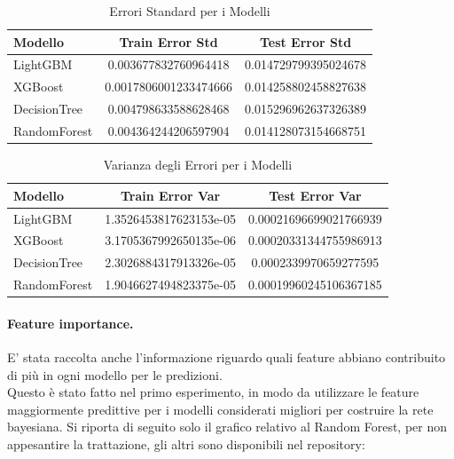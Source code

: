 \begin{table}[H]
    \centering
    \begin{tabular}{lcc}
    \toprule
    \textbf{Modello} & \textbf{Train Error Std} & \textbf{Test Error Std} \\
    \midrule
    LightGBM & 0.003677832760964418 & 0.014729799395024678 \\
    XGBoost & 0.0017806001233474666 & 0.014258802458827638 \\
    DecisionTree & 0.004798633588628468 & 0.015296962637326389 \\
    RandomForest & 0.004364244206597904 & 0.014128073154668751 \\
    \bottomrule
    \end{tabular}
    \caption{Errori Standard per i Modelli}
    
\end{table}

\begin{table}[H]
    \centering
    \begin{tabular}{lcc}
    \toprule
    \textbf{Modello} & \textbf{Train Error Var} & \textbf{Test Error Var} \\
    \midrule
    LightGBM & 1.3526453817623153e-05 & 0.00021696699021766939 \\
    XGBoost & 3.1705367992650135e-06 & 0.00020331344755986913 \\
    DecisionTree & 2.3026884317913326e-05 & 0.0002339970659277595 \\
    RandomForest & 1.9046627494823375e-05 & 0.00019960245106367185 \\
    \bottomrule
    \end{tabular}
    \caption{Varianza degli Errori per i Modelli}
    
\end{table}

\paragraph{Feature importance.} E' stata raccolta anche l'informazione riguardo quali feature abbiano contribuito di più in ogni modello per le predizioni.
\\Questo è stato fatto nel primo esperimento, in modo da utilizzare le feature maggiormente predittive per i modelli considerati migliori per costruire la rete bayesiana. Si riporta di seguito solo il grafico relativo al Random Forest, per non appesantire la trattazione, gli altri sono disponibili nel repository:

